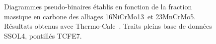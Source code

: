 \begin{figure}[h]
  \centering
  \hfill
  
  \caption{\label{fig:pseudo_binaires}Diagrammes pseudo-binaires établis en fonction de la fraction massique en carbone des alliages \protect{} 16NiCrMo13 et \protect{} 23MnCrMo5. Résultats obtenus avec Thermo-Calc~\cite{Andersson2002,Borgenstam2000}. Traits pleins base de données SSOL4, pontillés TCFE7.}
\end{figure}

